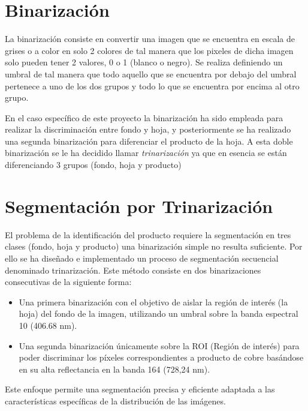 \section{Binarización}

 La binarización \cite{SAUVOLA2000225} consiste en convertir una imagen que se encuentra en escala de grises o a color en solo 2 colores de tal manera que los pixeles de dicha imagen solo pueden tener 2 valores, 0 o 1 (blanco o negro). Se realiza definiendo un umbral de tal manera que todo aquello que se encuentra por debajo del umbral pertenece a uno de los dos grupos y todo lo que se encuentra por encima al otro grupo.


 En el caso específico de este proyecto la binarización ha sido empleada para realizar la discriminación entre fondo y hoja, y posteriormente se ha realizado una segunda binarización para diferenciar el producto de la hoja. A esta doble binarización se le ha decidido llamar \textit{trinarización} ya que en esencia se están diferenciando 3 grupos (fondo, hoja y producto)


\section{Segmentación por Trinarización}

El problema de la identificación del producto requiere la segmentación en tres clases (fondo, hoja y producto) una binarización simple no resulta suficiente. Por ello se ha diseñado e implementado un proceso de segmentación secuencial denominado trinarización. Este método consiste en dos binarizaciones consecutivas de la siguiente forma:
\begin{itemize}

\item Una primera binarización con el objetivo de aislar la región de interés (la hoja) del fondo de la imagen, utilizando un umbral sobre la banda espectral 10 (406.68 nm).
\item Una segunda binarización únicamente sobre la ROI (Región de interés) para poder discriminar los píxeles correspondientes a producto de cobre basándose en su alta reflectancia en la banda 164 (728,24 nm)\cite{SANCHEZ2025101049}.
\end{itemize}
Este enfoque permite una segmentación precisa y eficiente adaptada a las características específicas de la distribución de las imágenes.
